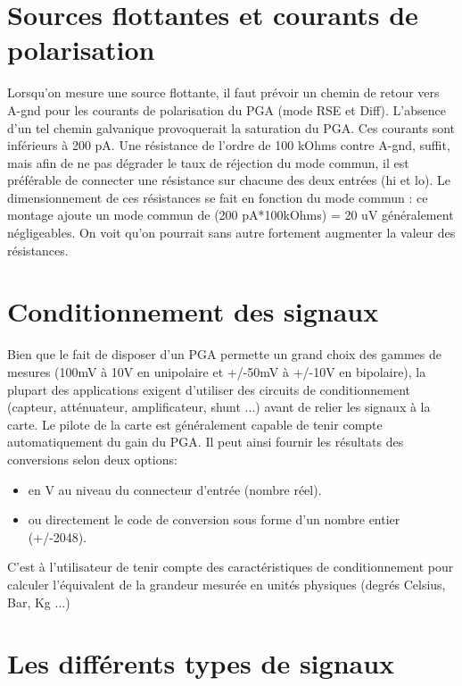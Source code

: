 \documentclass[main.tex]{subfiles}
\begin{document}
\section{Sources flottantes et courants de polarisation}

Lorsqu'on mesure une source flottante, il faut prévoir un chemin de retour vers A-gnd pour les courants de polarisation du PGA (mode RSE et Diff). L'absence d'un tel chemin galvanique provoquerait la saturation du PGA. Ces courants sont inférieurs à 200 pA. Une résistance de l'ordre de 100 kOhms contre A-gnd, suffit, mais afin de ne pas dégrader le taux de réjection du mode commun, il est préférable de connecter une résistance sur chacune des deux entrées (hi et lo). Le dimensionnement de ces résistances se fait en fonction du mode commun : ce montage ajoute un mode commun de (200 pA*100kOhms) = 20 uV généralement négligeables. On voit qu'on pourrait sans autre fortement augmenter la valeur des résistances.

\section{Conditionnement des signaux}

Bien que le fait de disposer d'un PGA permette un grand choix des gammes de mesures (100mV à 10V en unipolaire et +/-50mV à +/-10V en bipolaire), la plupart des applications exigent d'utiliser des circuits de conditionnement  (capteur, atténuateur, amplificateur, shunt ...) avant de relier les signaux à la carte. Le pilote de la carte est généralement capable de tenir compte automatiquement du gain du PGA. Il peut ainsi fournir les résultats des conversions selon deux options:

\begin{itemize}
    \item en V au niveau du connecteur d'entrée (nombre réel).
    \item ou directement le code de conversion sous forme d'un nombre entier (+/-2048).
\end{itemize}

C'est à l'utilisateur de tenir compte des caractéristiques de conditionnement pour calculer l'équivalent de la grandeur mesurée en unités physiques (degrés Celsius, Bar, Kg ...)

\section{Les différents types de signaux}
\end{document}
